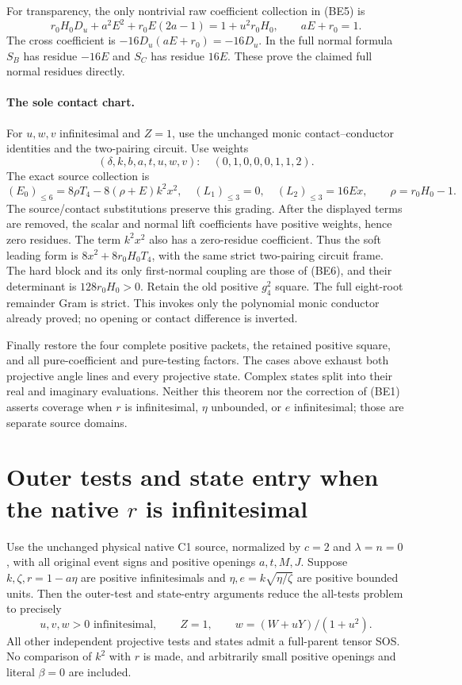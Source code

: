 For transparency, the only nontrivial raw coefficient collection in
(BE5) is
\[
 r_0H_0D_u+a^2E^2+r_0E(2a-1)=1+u^2r_0H_0,
 \qquad aE+r_0=1.
\]
The cross coefficient is $-16D_u(aE+r_0)=-16D_u$.
In the full normal formula $S_B$ has residue $-16E$ and $S_C$ has
residue $16E$. These prove the claimed full normal residues directly.

\paragraph{The sole contact chart.}
For $u,w,v$ infinitesimal and $Z=1$, use the unchanged monic
contact--conductor identities and the two-pairing circuit. Use weights
\[ (\delta,k,b,a,t,u,w,v):\quad(0,1,0,0,0,1,1,2). \]
The exact source collection is
\[
 (E_0)_{\le6}=8\rho T_4-8(\rho+E)k^2x^2,
 \quad (L_1)_{\le3}=0,\quad (L_2)_{\le3}=16Ex,
 \qquad \rho=r_0H_0-1.
\]
The source/contact substitutions preserve this grading. After the
displayed terms are removed, the scalar and normal lift coefficients
have positive weights, hence zero residues. The term $k^2x^2$ also
has a zero-residue coefficient. Thus the soft leading form is
$8x^2+8r_0H_0T_4$, with the same strict two-pairing circuit frame.
The hard block and its only first-normal coupling are those of (BE6),
and their determinant is $128r_0H_0>0$. Retain the old positive
$g_4^2$ square. The full eight-root remainder Gram is strict.
This invokes only the polynomial monic conductor already proved;
no opening or contact difference is inverted.

Finally restore the four complete positive packets, the retained
positive square, and all pure-coefficient and pure-testing factors.
The cases above exhaust both projective angle lines and every
projective state. Complex states split into their real and imaginary
evaluations. Neither this theorem nor the correction of (BE1) asserts
coverage when $r$ is infinitesimal, $\eta$ unbounded, or $e$
infinitesimal; those are separate source domains.


\section{\texorpdfstring{Outer tests and state entry when the native $r$ is infinitesimal}{Outer tests and state entry when the native r is infinitesimal}}
\label{component:p364e14238053}

\label{p364e14238053:sec:centered-a-outer}

\begin{lemma}
Use the unchanged physical native C1 source, normalized by $c=2$ and
$\lambda=n=0$, with all original event signs and positive openings
$a,t,M,J$. Suppose $k,\zeta,r=1-a\eta$ are positive infinitesimals and
$\eta,e=k\sqrt{\eta/\zeta}$ are positive bounded units.
Then the outer-test and state-entry arguments reduce the all-tests
problem to precisely
\[
 u,v,w>0\text{ infinitesimal},\qquad Z=1,
 \qquad w=(W+uY)/(1+u^2).
 \tag{CAO1}
\]
All other independent projective tests and states admit a full-parent
tensor SOS. No comparison of $k^2$ with $r$ is made, and arbitrarily
small positive openings and literal $\beta=0$ are included.
\end{lemma}

